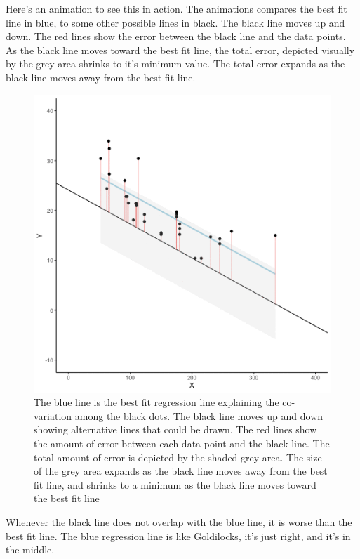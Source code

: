 \documentclass[
]{book}
\begin{document}
Here's an animation to see this in action. The animations compares the best fit line in blue, to some other possible lines in black. The black line moves up and down. The red lines show the error between the black line and the data points. As the black line moves toward the best fit line, the total error, depicted visually by the grey area shrinks to it's minimum value. The total error expands as the black line moves away from the best fit line.

\begin{figure}
\centering
\includegraphics{gifs/regression-1.gif}
\caption{\label{fig:3regressionGIF}The blue line is the best fit regression line explaining the co-variation among the black dots. The black line moves up and down showing alternative lines that could be drawn. The red lines show the amount of error between each data point and the black line. The total amount of error is depicted by the shaded grey area. The size of the grey area expands as the black line moves away from the best fit line, and shrinks to a minimum as the black line moves toward the best fit line}
\end{figure}

Whenever the black line does not overlap with the blue line, it is worse than the best fit line. The blue regression line is like Goldilocks, it's just right, and it's in the middle.
\end{document}
